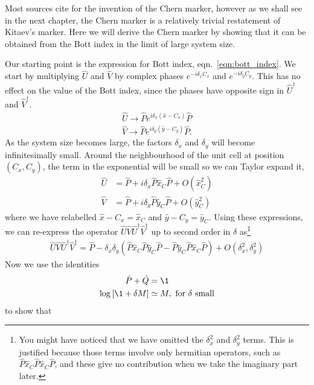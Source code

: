 Most sources cite \cite{bianco_mapping_2011} for the invention of the Chern marker, however as we shall see in the next chapter, the Chern marker is a relatively trivial restatement of Kitaev's marker. Here we will derive the Chern marker by showing that it can be obtained from the Bott index in the limit of large system size.\par
Our starting point is the expression for Bott index, eqn.~\ref{eqn:bott_index}. We start by multiplying $\hat U$  and $\hat V$ by complex phases $e^{-i \delta_x C_x}$ and $e^{-i \delta_y C_y}$. This has no effect on the value of the Bott index, since the phases have opposite sign in $\hat U ^\dag$ and $\hat V ^\dag$.
\begin{align}
	\hat U  \rightarrow \hat P e^{i \delta_x (\hat x - C_x)} \hat P \\
	\hat V  \rightarrow \hat P e^{i \delta_y (\hat y - C_y)} \hat P.
\end{align}
As the system size becomes large, the factors $\delta_x$ and $\delta_y$ will become infinitesimally small. Around the neighbourhood of the unit cell at position $(C_x, C_y)$, the term in the exponential will be small so we can Taylor expand it,
\begin{align}
	\hat U &=  \hat P + i \delta_x \hat P \hat x_C \hat P + O(\hat x_C^2)\\
	\hat V &= \hat P + i \delta_y \hat P \hat y_C \hat P + O(\hat y_C^2)
\end{align}
where we have relabelled $ \hat x - C_x= \hat x_C$ and $ \hat y - C_y= \hat y_C$.  Using these expressions, we can re-express the operator $\hat U\hat V\hat U^\dag \hat V^\dag$ up to second order in $\delta$ as\footnote{You might have noticed that we have omitted the $\delta_x^2$ and $\delta_y^2$ terms. This is justified because those terms involve only hermitian operators, such as $ \hat P \hat x_C \hat P \hat x_C \hat P$, and these give no contribution when we take the imaginary part later.}
\begin{align}
 	\hat U\hat V\hat U^\dag \hat V^\dag = \hat P  - \delta_x \delta_y \left (  \hat P \hat x_C \hat P \hat y_C \hat P  -  \hat P \hat y_C \hat P \hat x_C \hat P \right ) + O(\delta_x^2, \delta_y^2)
\end{align}
Now we use the identities 
\begin{align}
	\hat P + \hat Q &= \1\\
	\log \left [ \1 + \delta M \right ] & \simeq M, \textup{  for  } \delta \textup{ small} 
\end{align}
to show that
